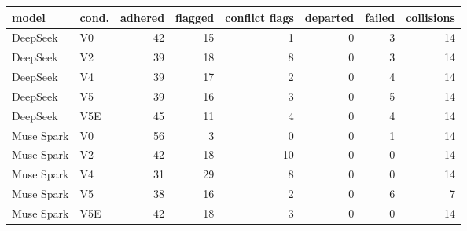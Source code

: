 \begin{tabular}{llrrrrrr}
\toprule
model & cond. & adhered & flagged & conflict flags & departed & failed & collisions \\
\midrule
DeepSeek & V0 & 42 & 15 & 1 & 0 & 3 & 14 \\
DeepSeek & V2 & 39 & 18 & 8 & 0 & 3 & 14 \\
DeepSeek & V4 & 39 & 17 & 2 & 0 & 4 & 14 \\
DeepSeek & V5 & 39 & 16 & 3 & 0 & 5 & 14 \\
DeepSeek & V5E & 45 & 11 & 4 & 0 & 4 & 14 \\
Muse Spark & V0 & 56 & 3 & 0 & 0 & 1 & 14 \\
Muse Spark & V2 & 42 & 18 & 10 & 0 & 0 & 14 \\
Muse Spark & V4 & 31 & 29 & 8 & 0 & 0 & 14 \\
Muse Spark & V5 & 38 & 16 & 2 & 0 & 6 & 7 \\
Muse Spark & V5E & 42 & 18 & 3 & 0 & 0 & 14 \\
\bottomrule
\end{tabular}
